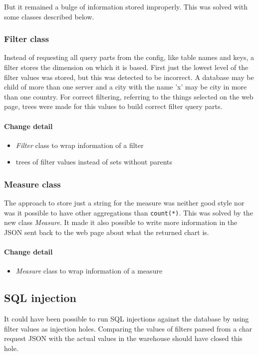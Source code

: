 But it remained a bulge of information stored improperly. This was
solved with some classes described below.

\subsubsection{Filter class} 
Instead of requesting all query parts from the config, like table names and keys,
a filter stores the dimension on which it is based. First just the lowest
level of the filter values was stored, but this was detected to be incorrect.
A database may be child of more than one server and a city with the name 'x'
may be city in more than one country. For correct filtering, referring
to the things selected on the web page, trees were made for this values 
to build correct filter query parts.

\paragraph{Change detail}
\begin{itemize}
  \item \textit{Filter} class to wrap information of a filter
  \item trees of filter values instead of sets without parents
\end{itemize}


\subsubsection{Measure class}
The approach to store just a string for the measure was neither good style
nor was it possible to have other aggregations than \texttt{count(*)}.
This was solved by the new class \textit{Measure}. It made it also possible
to write more information in the JSON sent back to the web page about what
the returned chart is.

\paragraph{Change detail}
\begin{itemize}
  \item \textit{Measure} class to wrap information of a measure
\end{itemize}

\subsection{SQL injection}
It could have been possible to run SQL injections against the database
by using filter values as injection holes. Comparing the values of filters
parsed from a char request JSON with the actual values in the warehouse
should have closed this hole.

